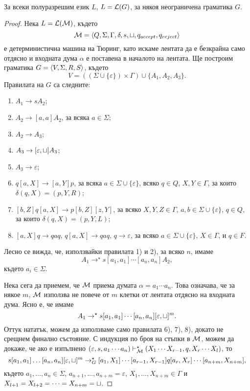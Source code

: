 \begin{lemma}
  За всеки полуразрешим език $L$, $L = \mathcal{L}(G)$, за някоя неограничена граматика $G$.  
\end{lemma}
\begin{proof}
  Нека $L = \mathcal{L}(\mathcal{M})$, където 
  \[\mathcal{M} = \langle{Q,\Sigma,\Gamma,\delta,s,\sqcup,q_{accept}, q_{reject}}\rangle\] е детерминистична машина на Тюринг,
  като искаме лентата да е безкрайна само отдясно и входната дума $\alpha$ е
  поставена в началото на лентата.
  Ще построим граматика $G = \langle{V,\Sigma,R,S}\rangle$, където 
  \[V = ((\Sigma\cup\{\varepsilon\})\times\Gamma) \cup \{A_1,A_2,A_3\}.\]
  Правилата на $G$ са следните:
  \begin{enumerate}[1)]
  \item 
    $A_1 \to sA_2$;
  \item
    $A_2 \to [a,a]A_2$, за всяка $a\in\Sigma$;
  \item
    $A_2 \to A_3$;
  \item
    $A_3 \to [\varepsilon,\sqcup]A_3$;
  \item
    $A_3 \to \varepsilon$;
  \item
    $q[a,X] \to [a,Y]p$, за всяка $a \in \Sigma\cup\{\varepsilon\}$, всяко $q\in Q$, $X,Y \in\Gamma$, 
    за които $\delta(q,X) = (p,Y,R)$;
  \item
    $[b,Z]q[a,X] \to p[b,Z][z,Y]$, за всяко $X,Y,Z \in \Gamma$, $a,b\in\Sigma\cup\{\varepsilon\}$, $q\in Q$,
    за които $\delta(q,X) = (p,Y,L)$;
  \item
    $[a,X]q \to qaq$, $q[a,X] \to qaq$, $q \to \varepsilon$, за всяко $a\in\Sigma\cup\{\varepsilon\}$, $X\in\Gamma$,
    и $q \in F$.
  \end{enumerate}
  
  Лесно се вижда, че, използвайки правилата 1) и 2), за всяко $n$, имаме
  \[A_1 \to^\star s[a_1,a_1]\cdots[a_n,a_n]A_2,\]
  където $a_i \in \Sigma$.

  Нека сега да приемем, че $\mathcal{M}$ приема думата $\alpha = a_1\cdots a_n$.
  Това означава, че за някое $m$, $\mathcal{M}$ използва не повече от $m$ клетки от лентата отдясно на входната дума.
  Ясно е, че имаме
  \[A_1 \to^\star s[a_1,a_1]\cdots[a_n,a_n][\varepsilon,\sqcup]^m.\]
  Оттук нататък, можем да използваме само правилата 6), 7), 8), докато не срещнем финално състояние.
  С индукция по броя на стъпки в $\mathcal{M}$, можем да докаже, че ако е изпълнено
  $(\varepsilon,s,a_1\cdots a_n) \vdash^\star_{\mathcal{M}} (X_1\cdots X_{r-1},q,X_r\cdots X_l)$, 
  то \[s[a_1,a_1]\dots[a_n,a_n][\varepsilon,\sqcup]^m \rightarrow^\star_G [a_1,X_1]\cdots[a_{r-1},X_{r-1}]q[a_r,X_r]\cdots[a_{n+m},X_{n+m}],\]
  където $a_1,\dots,a_n \in \Sigma$, $a_{n+1},\dots,a_{n+m} = \varepsilon$, $X_1,\dots,X_{n+m} \in \Gamma$ и
  $X_{l+1} = X_{l+2} = \dots = X_{n+m} = \sqcup$.
  

\end{proof}

